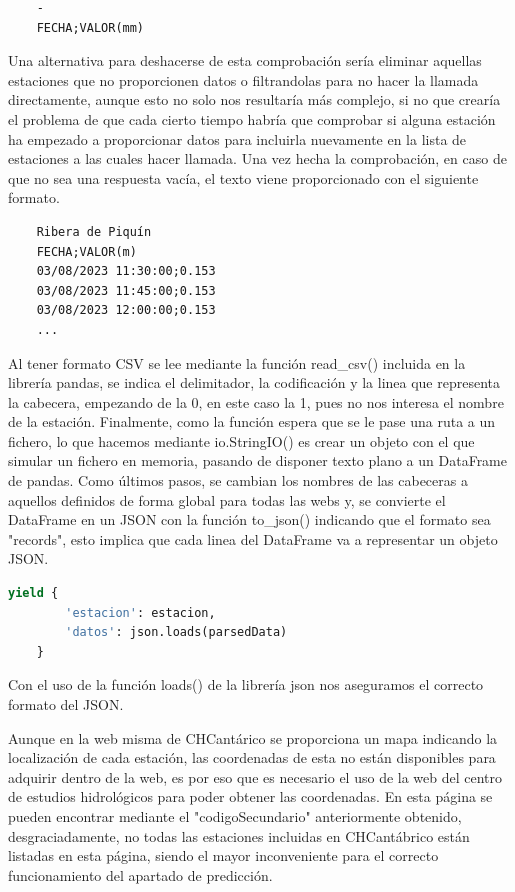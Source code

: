 \begin{verbatim}
	-
	FECHA;VALOR(mm)
\end{verbatim}

Una alternativa para deshacerse de esta comprobación sería eliminar aquellas estaciones que no proporcionen datos o filtrandolas para no hacer la llamada directamente, aunque esto no solo nos resultaría más complejo, si no que crearía el problema de que cada cierto tiempo habría que comprobar si alguna estación ha empezado a proporcionar datos para incluirla nuevamente en la lista de estaciones a las cuales hacer llamada.\newline
\newline
Una vez hecha la comprobación, en caso de que no sea una respuesta vacía, el texto viene proporcionado con el siguiente formato.

\begin{verbatim}
	Ribera de Piquín
	FECHA;VALOR(m)
	03/08/2023 11:30:00;0.153
	03/08/2023 11:45:00;0.153
	03/08/2023 12:00:00;0.153
	...
\end{verbatim}

Al tener formato CSV se lee mediante la función read\_csv() incluida en la librería pandas, se indica el delimitador, la codificación y la linea que representa la cabecera, empezando de la 0, en este caso la 1, pues no nos interesa el nombre de la estación. Finalmente, como la función espera que se le pase una ruta a un fichero, lo que hacemos mediante io.StringIO() es crear un objeto con el que simular un fichero en memoria, pasando de disponer texto plano a un DataFrame de pandas.\newline
\newline
Como últimos pasos, se cambian los nombres de las cabeceras a aquellos definidos de forma global para todas las webs y, se convierte el DataFrame en un JSON con la función to\_json() indicando que el formato sea "records", esto implica que cada linea del DataFrame va a representar un objeto JSON.

\begin{lstlisting}[language=Python, caption={Chcantabrico Nivel Spider}]
	yield {
		'estacion': estacion,
		'datos': json.loads(parsedData)
	}
\end{lstlisting}

Con el uso de la función loads() de la librería json nos aseguramos el correcto formato del JSON.

Aunque en la web misma de CHCantárico se proporciona un mapa indicando la localización de cada estación, las coordenadas de esta no están disponibles para adquirir dentro de la web, es por eso que es necesario el uso de la web del centro de estudios hidrológicos para poder obtener las coordenadas. En esta página se pueden encontrar mediante el "codigoSecundario" anteriormente obtenido, desgraciadamente, no todas las estaciones incluidas en CHCantábrico están listadas en esta página, siendo el mayor inconveniente para el correcto funcionamiento del apartado de predicción.

